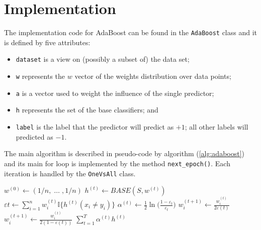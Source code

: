\section{Implementation}
The implementation code for AdaBoost can be found in the \texttt{AdaBoost} class and it is defined by five attributes:
\begin{itemize}
	\item \texttt{dataset} is a view on (possibly a subset of) the data set;
	\item \texttt{w} represents the $w$ vector of the weights distribution over data points;
	\item \texttt{a} is a vector used to weight the influence of the single predictor;
	\item \texttt{h} represents the set of the base classifiers; and
	\item \texttt{label} is the label that the predictor will predict as $+1$; all other labels will predicted as $-1$.
\end{itemize}
The main algorithm is described in pseudo-code by algorithm (\ref{alg:adaboost}) and its main for loop is implemented by the method \texttt{next\_epoch()}. Each iteration is handled by the \texttt{OneVsAll} class.
\begin{algorithm}[htpb]
	\caption{}
	\label{alg:adaboost}
	\begin{algorithmic}[]
		\State $w^{(0)} \gets (1/n,\;\dots\;,1/n)$
			\State $h^{(t)} \gets BASE(S, w^{(t)})$
			\State $\varepsilon{t} \gets \sum_{i=1}^{n}w_{i}^{(t)}\mathbb{I}\lbrace h^{(t)}(x_{i} \neq y_{i}) \rbrace $
			\State $\alpha^{(t)} \gets \frac{1}{2}\ln\Big(\frac{1-\varepsilon_{t}}{\varepsilon_{t}}\Big)$
					\State $w_{i}^{(t+1)}\gets\frac{w_{i}^{(t)}}{2\varepsilon{(t)}}$
				\Else
					\State $w_{i}^{(t+1)}\gets\frac{w_{i}^{(t)}}{2(1-\varepsilon{(t)})}$
				\EndIf
			\EndFor
		\EndFor
		\Return $\sum_{t=1}^{T}\alpha^{(t)}h^{(t)}$
		\EndProcedure
	\end{algorithmic}
\end{algorithm}






